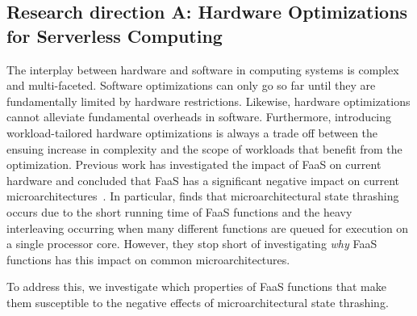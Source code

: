\documentclass[../main.tex]{subfiles}
\begin{document}
\begin{refsection}
\subsection{Research direction A: Hardware Optimizations for Serverless Computing}
\label{sec:rda}

The interplay between hardware and software in computing systems is
complex and multi-faceted. Software optimizations can only go so far
until they are fundamentally limited by hardware
restrictions. Likewise, hardware optimizations cannot alleviate
fundamental overheads in software. Furthermore, introducing
workload-tailored hardware optimizations is always a trade off between
the ensuing increase in complexity and the scope of workloads that
benefit from the optimization. Previous work has investigated the
impact of FaaS on current hardware and concluded that FaaS has a
significant negative impact on current
microarchitectures~\cite{shahrad19_archit_implic_funct_servic_comput,lukewarm_serverless}. In
particular, \textcite{lukewarm_serverless} finds that
microarchitectural state thrashing occurs due to the short running
time of FaaS functions and the heavy interleaving occurring when many
different functions are queued for execution on a single processor core. However, they stop short of investigating \emph{why} FaaS
functions has this impact on common microarchitectures.

To address this, we investigate which properties of FaaS functions
that make them susceptible to the negative effects of
microarchitectural state thrashing.




\end{refsection}
\end{document}
